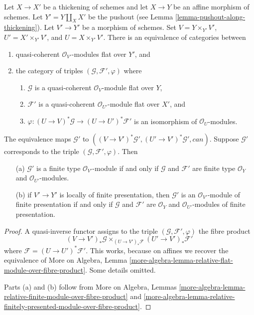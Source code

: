 \begin{lemma}
\label{lemma-scheme-over-pushout-flat-modules}
Let $X \to X'$ be a thickening of schemes and let $X \to Y$ be an
affine morphism of schemes. Let $Y' = Y \amalg_X X'$ be the pushout
(see Lemma \ref{lemma-pushout-along-thickening}). Let $V' \to Y'$
be a morphism of schemes. Set
$V = Y \times_{Y'} V'$, $U' = X' \times_{Y'} V'$, and $U = X \times_{Y'} V'$.
There is an equivalence of categories between
\begin{enumerate}
\item quasi-coherent $\mathcal{O}_{V'}$-modules flat over $Y'$, and
\item the category of triples $(\mathcal{G}, \mathcal{F}', \varphi)$ where
\begin{enumerate}
\item $\mathcal{G}$ is a quasi-coherent $\mathcal{O}_V$-module flat over $Y$,
\item $\mathcal{F}'$ is a quasi-coherent $\mathcal{O}_{U'}$-module flat
over $X'$, and
\item $\varphi : (U \to V)^*\mathcal{G} \to (U \to U')^*\mathcal{F}'$
is an isomorphism of $\mathcal{O}_U$-modules.
\end{enumerate}
\end{enumerate}
The equivalence maps $\mathcal{G}'$ to
$((V \to V')^*\mathcal{G}', (U' \to V')^*\mathcal{G}', can)$.
Suppose $\mathcal{G}'$ corresponds to the triple
$(\mathcal{G}, \mathcal{F}', \varphi)$. Then
\begin{enumerate}
\item[(a)] $\mathcal{G}'$ is a finite type $\mathcal{O}_{V'}$-module if and
only if $\mathcal{G}$ and $\mathcal{F}'$ are finite type
$\mathcal{O}_Y$ and $\mathcal{O}_{U'}$-modules.
\item[(b)] if $V' \to Y'$ is locally of finite presentation, then
$\mathcal{G}'$ is an $\mathcal{O}_{V'}$-module of finite
presentation if and only if $\mathcal{G}$ and $\mathcal{F}'$ are
$\mathcal{O}_Y$ and $\mathcal{O}_{U'}$-modules of finite presentation.
\end{enumerate}
\end{lemma}

\begin{proof}
A quasi-inverse functor assigns to the triple
$(\mathcal{G}, \mathcal{F}', \varphi)$ the fibre product
$$
(V \to V')_*\mathcal{G}
\times_{(U \to V')_*\mathcal{F}}
(U' \to V')_*\mathcal{F}'
$$
where $\mathcal{F} = (U \to U')^*\mathcal{F}'$. This works, because on
affines we recover the equivalence of More on Algebra, Lemma
\ref{more-algebra-lemma-relative-flat-module-over-fibre-product}.
Some details omitted.

\medskip\noindent
Parts (a) and (b) follow from
More on Algebra, Lemmas
\ref{more-algebra-lemma-relative-finite-module-over-fibre-product} and
\ref{more-algebra-lemma-relative-finitely-presented-module-over-fibre-product}.
\end{proof}

